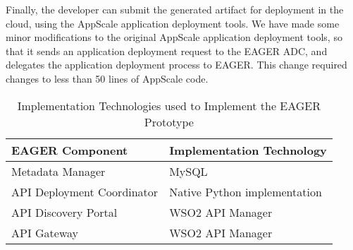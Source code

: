 Finally, the developer can submit the generated artifact for deployment in the
cloud, using the AppScale application deployment tools. We have made some
minor modifications to the original AppScale application deployment tools, so
that it sends an application deployment request to the EAGER ADC, and
delegates the application deployment process to EAGER. This change required
changes to less than 50 lines of AppScale code.


\begin{table}[ht]
\begin{center}
\begin{tabular}{| p{4cm} | p{4cm} |}
\hline
EAGER Component & Implementation Technology\\ \hline
Metadata Manager & MySQL~\cite{mysql}\\
API Deployment Coordinator & Native Python implementation\\
API Discovery Portal & WSO2 API Manager~\cite{wso2am}\\
API Gateway & WSO2 API Manager\\
\hline
\end{tabular}
\end{center}
\caption{Implementation Technologies used to Implement the EAGER Prototype}
\label{tab:imp-tech}
\end{table}

%


